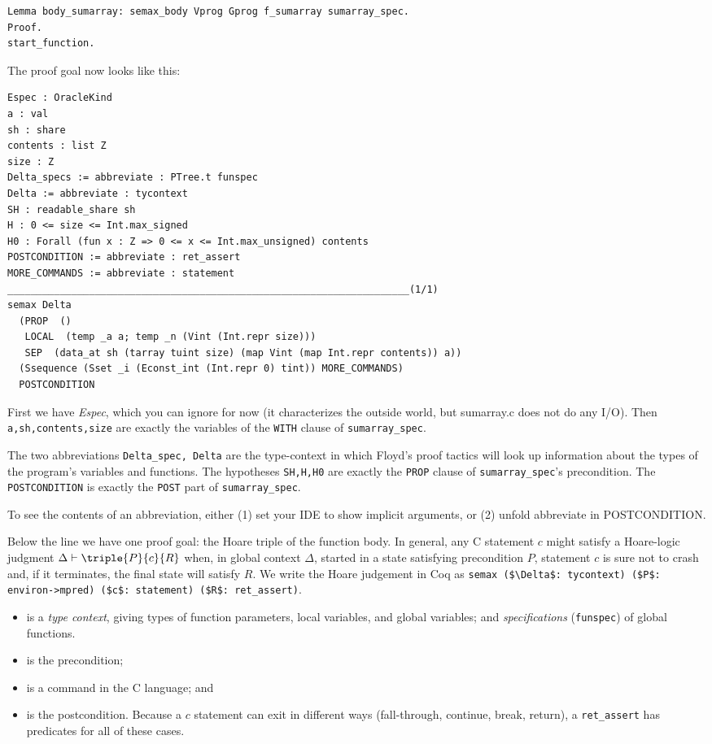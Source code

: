 \documentclass[12pt,fleqn,openany,oneside,showtrims]{memoir}
\begin{document}
\begin{lstlisting}
Lemma body_sumarray: semax_body Vprog Gprog f_sumarray sumarray_spec.
Proof.
start_function.
\end{lstlisting}
The proof goal now looks like this:\label{refcard:body-sumarray1}
\begin{lstlisting}
Espec : OracleKind
a : val
sh : share
contents : list Z
size : Z
Delta_specs := abbreviate : PTree.t funspec
Delta := abbreviate : tycontext
SH : readable_share sh
H : 0 <= size <= Int.max_signed
H0 : Forall (fun x : Z => 0 <= x <= Int.max_unsigned) contents
POSTCONDITION := abbreviate : ret_assert
MORE_COMMANDS := abbreviate : statement
_____________________________________________________________________(1/1)
semax Delta
  (PROP  ()
   LOCAL  (temp _a a; temp _n (Vint (Int.repr size)))
   SEP  (data_at sh (tarray tuint size) (map Vint (map Int.repr contents)) a))
  (Ssequence (Sset _i (Econst_int (Int.repr 0) tint)) MORE_COMMANDS)
  POSTCONDITION
\end{lstlisting}
First we have \emph{Espec}, which you can ignore for now (it
characterizes the outside world, but sumarray.c does not
do any I/O).  Then \lstinline{a,sh,contents,size}
  are exactly the variables of the \lstinline{WITH} clause
  of \lstinline{sumarray_spec}.

  The two abbreviations \lstinline{Delta_spec, Delta} are the
  type-context in which Floyd's proof tactics will look up
  information about the types of the program's variables and functions.
  The hypotheses \lstinline{SH,H,H0} are exactly the
  \lstinline{PROP} clause of \lstinline{sumarray_spec}'s precondition.
  The \lstinline{POSTCONDITION} is exactly the
  \lstinline{POST} part of \lstinline{sumarray_spec}.

  To see the contents of an abbreviation, either (1) set your IDE to show implicit arguments, or (2) \textsf{unfold abbreviate in POSTCONDITION}.

  Below the line we have one proof goal: the Hoare triple
  of the function body.  In general, any C statement $c$
  might satisfy a Hoare-logic judgment
  $\Delta\vdash\triple{P}{c}{R}$ when, in global context $\Delta$,
  started in a state satisfying precondition $P$, statement $c$ is sure
  not to crash and, if it terminates, the final state will satisfy $R$.
  We write the Hoare judgement in Coq as\newline
\lstinline{semax ($\Delta$: tycontext) ($P$: environ->mpred) ($c$: statement) ($R$: ret_assert)}.
\begin{itemize}
\item[$\Delta$] is a \emph{type context}, giving types of function parameters, local variables, and global variables; and \emph{specifications} (\lstinline{funspec}) of global functions.
\item[$P$] is the precondition;
\item[$c$] is a command in the C language; and
\item[$R$] is the postcondition.  Because a $c$ statement can exit in different ways (fall-through, continue, break, return), a \lstinline{ret_assert}
has predicates for all of these cases.
\end{itemize}
\end{document}
